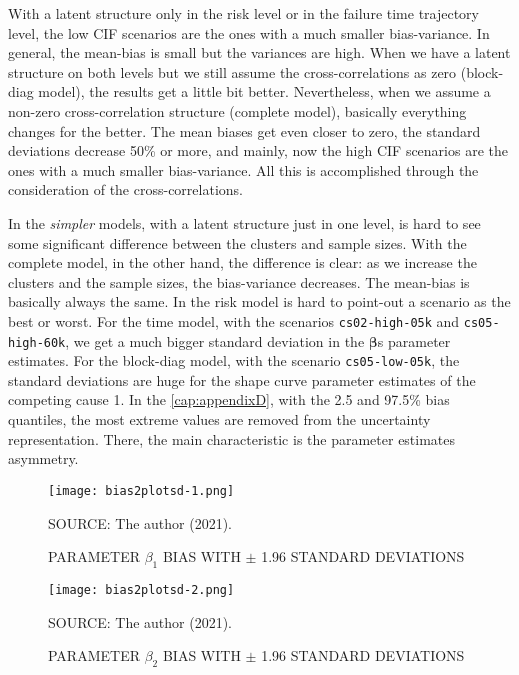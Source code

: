 With a latent structure only in the risk level or in the failure time
trajectory level, the low CIF scenarios are the ones with a much smaller
bias-variance. In general, the mean-bias is small but the variances are
high. When we have a latent structure on both levels but we still assume
the cross-correlations as zero (block-diag model), the results get a
little bit better. Nevertheless, when we assume a non-zero
cross-correlation structure (complete model), basically everything
changes for the better. The mean biases get even closer to zero, the
standard deviations decrease 50\% or more, and mainly, now the high CIF
scenarios are the ones with a much smaller bias-variance. All this is
accomplished through the consideration of the cross-correlations.

In the \textit{simpler} models, with a latent structure just in one
level, is hard to see some significant difference between the clusters
and sample sizes. With the complete model, in the other hand, the
difference is clear: as we increase the clusters and the sample sizes,
the bias-variance decreases. The mean-bias is basically always the
same. In the risk model is hard to point-out a scenario as the best or
worst. For the time model, with the scenarios \texttt{cs02-high-05k}
and \texttt{cs05-high-60k}, we get a much bigger standard deviation in
the \(\bm{\beta}\)s parameter estimates. For the block-diag model, with
the scenario \texttt{cs05-low-05k}, the standard deviations are huge for
the shape curve parameter estimates of the competing cause 1. In
the \autoref{cap:appendixD}, with the 2.5 and 97.5\% bias quantiles, the
most extreme values are removed from the uncertainty
representation. There, the main characteristic is the parameter
estimates asymmetry.

\begin{figure}[H]
 \setlength{\abovecaptionskip}{.0001pt}
 \caption{PARAMETER \(\beta_{1}\) BIAS WITH \(\pm\) 1.96 STANDARD
          DEVIATIONS}
 \vspace{0.2cm}\centering
 \texttt{[image: bias2plotsd-1.png]}\\
 \begin{footnotesize}
  SOURCE: The author (2021).
 \end{footnotesize}
 \label{fig:biassdbeta1}
\end{figure}

\begin{figure}[H]
 \setlength{\abovecaptionskip}{.0001pt}
 \caption{PARAMETER \(\beta_{2}\) BIAS WITH \(\pm\) 1.96 STANDARD
         DEVIATIONS}
 \vspace{0.2cm}\centering
 \texttt{[image: bias2plotsd-2.png]}\\
 \begin{footnotesize}
  SOURCE: The author (2021).
 \end{footnotesize}
 \label{fig:biassdbeta2}
\end{figure}

